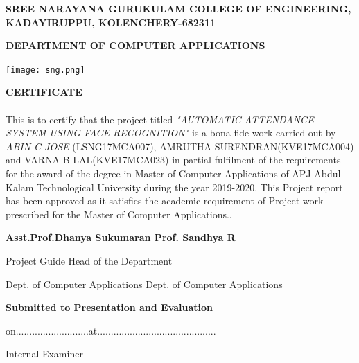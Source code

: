 \documentclass[a4paper, 12pt]{report}
\begin{document}
\begin{titlepage}
	{\fontsize{16pt}{16pt}\selectfont\bfseries\center SREE NARAYANA GURUKULAM COLLEGE OF ENGINEERING, KADAYIRUPPU, KOLENCHERY-682311\par}
	{\fontsize{14pt}{14pt}\selectfont\bfseries\center DEPARTMENT OF COMPUTER APPLICATIONS\par}
	\begin{center}
\texttt{[image: sng.png]}\par
     \end{center}
	{\fontsize{16pt}{16pt}\selectfont\bfseries\center CERTIFICATE \par}
	\paragraph{}{\fontsize{12pt}{12pt}\selectfont This is to certify that the project titled \textit{"AUTOMATIC ATTENDANCE SYSTEM USING FACE RECOGNITION"} is a bona-fide work carried out by \textit{ABIN C JOSE} (LSNG17MCA007), AMRUTHA SURENDRAN(KVE17MCA004) and VARNA B LAL(KVE17MCA023) in partial fulfilment
of the requirements for the award of the degree in Master of Computer Applications of APJ Abdul Kalam Technological University during the year 2019-2020. This Project report has been approved
as it satisfies the academic requirement of Project work prescribed for the Master of Computer
Applications..}\\\vspace{1cm}
	
	{\fontsize{14pt}{14pt}\selectfont\bfseries Asst.Prof.Dhanya Sukumaran \hspace{60pt} Prof. Sandhya R\par}
    {\fontsize{14pt}{14pt}\selectfont Project Guide \hspace{180pt} Head of the Department\par}	
    {\fontsize{14pt}{14pt}\selectfont Dept. of Computer Applications\hspace{70pt}  Dept. of Computer Applications\par}
    {\fontsize{14pt}{14pt}\selectfont  \hspace{200pt} \par}
    \vspace{1cm}
	{\fontsize{14pt}{14pt}\selectfont\bfseries  Submitted to Presentation and Evaluation \par}
	{\fontsize{14pt}{14pt}\selectfont \hspace{80pt} on...........................at............................................ \par}
	  \vspace{1cm}
	{\fontsize{14pt}{14pt}\selectfont  \hspace{350pt} Internal Examiner  \par}
\end{titlepage}
\end{document}
